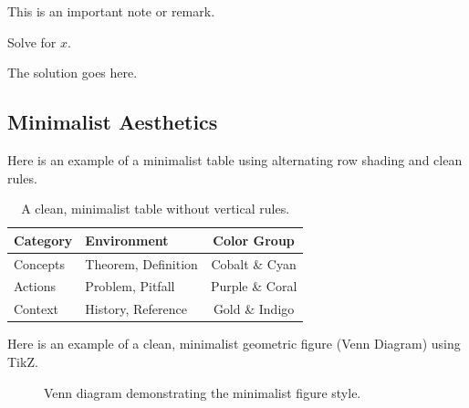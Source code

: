 \documentclass[12pt, letterpaper, twoside]{book}
\begin{document}
\begin{note}
  This is an important note or remark.
\end{note}

\begin{keyreference}
\end{keyreference}

\begin{problem}
  Solve for $x$.
\end{problem}

\begin{solution}
  The solution goes here.
\end{solution}

\subsection{Minimalist Aesthetics}

\begin{intertextbox}
Here is an example of a minimalist table using alternating row shading and clean rules.
\end{intertextbox}
\begin{table}[htbp]
  \centering
  \begin{tabular}{llc}
    \toprule
    \textbf{Category} & \textbf{Environment} & \textbf{Color Group} \\
    \midrule
    Concepts          & Theorem, Definition  & Cobalt \& Cyan       \\
    Actions           & Problem, Pitfall     & Purple \& Coral      \\
    Context           & History, Reference   & Gold \& Indigo       \\
    \bottomrule
  \end{tabular}
  \caption{A clean, minimalist table without vertical rules.}
\end{table}

\begin{intertextbox}
Here is an example of a clean, minimalist geometric figure (Venn Diagram) using TikZ.
\end{intertextbox}
\begin{figure}[htbp]
  \centering
  \caption{Venn diagram demonstrating the minimalist figure style.}
\end{figure}
\end{document}
